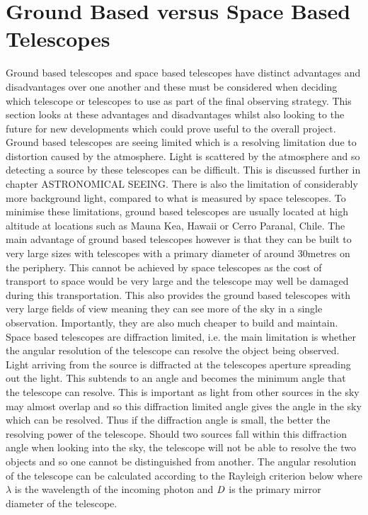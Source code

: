 \documentclass[pdf,color]{UoBnote}
\begin{document}
\section{Ground Based versus Space Based Telescopes}
Ground based telescopes and space based telescopes have distinct advantages and disadvantages over one another and these must be considered when deciding which telescope or telescopes to use as part of the final observing strategy. This section looks at these advantages and disadvantages whilst also looking to the future for new developments which could prove useful to the overall project.\\
\newline
Ground based telescopes are seeing limited which is a resolving limitation due to distortion caused by the atmosphere. Light is scattered by the atmosphere and so detecting a source by these telescopes can be difficult. This is discussed further in chapter ASTRONOMICAL SEEING. There is also the limitation of considerably more background light, compared to what is measured by space telescopes. To minimise these limitations, ground based telescopes are usually located at high altitude at locations such as Mauna Kea, Hawaii or Cerro Paranal, Chile. The main advantage of ground based telescopes however is that they can be built to very large sizes with telescopes with a primary diameter of around 30metres on the periphery. This cannot be achieved by space telescopes as the cost of transport to space would be very large and the telescope may well be damaged during this transportation. This also provides the ground based telescopes with very large fields of view meaning they can see more of the sky in a single observation. Importantly, they are also much cheaper to build and maintain.\\
\newline
Space based telescopes are diffraction limited, i.e. the main limitation is whether the angular resolution of the telescope can resolve the object being observed. Light arriving from the source is diffracted at the telescopes aperture spreading out the light. This subtends to an angle and becomes the minimum angle that the telescope can resolve. This is important as light from other sources in the sky may almost overlap and so this diffraction limited angle gives the angle in the sky which can be resolved. Thus if the diffraction angle is small, the better the resolving power of the telescope. Should two sources fall within this diffraction angle when looking into the sky, the telescope will not be able to resolve the two objects and so one cannot be distinguished from another. The angular resolution of the telescope can be calculated according to the Rayleigh criterion below where $\lambda$ is the wavelength of the incoming photon and $\it{D}$ is the primary mirror diameter of the telescope.\\
\end{document}
